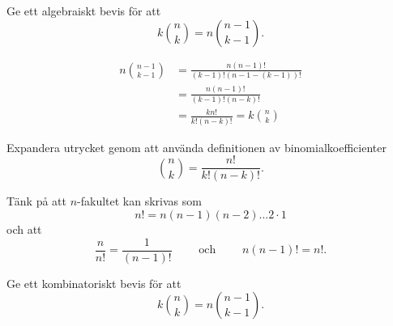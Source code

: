 \documentclass{tufte-handout}
\begin{document}
\begin{xca}
	Ge ett algebraiskt bevis för att
	$$k\binom{n}{k} = n \binom{n-1}{k-1}.$$
\end{xca}

\begin{solution}
	\begin{align*}
		n \binom{n-1}{k-1} &= \frac{n(n-1)!}{(k-1)!(n-1-(k-1))!}\\
		&= \frac{n(n-1)!}{(k-1)!(n-k)!}\\
		&= \frac{k n!}{k!(n-k)!} = k\binom{n}{k}	
	\end{align*}
    
	\begin{tips}
		Expandera utrycket genom att använda definitionen av binomialkoefficienter
		$$\binom{n}{k} = \frac{n!}{k!(n-k)!}.$$

		Tänk på att $n$-fakultet kan skrivas som
		$$n! = n(n-1)(n-2)...2\cdot 1$$ 
		och att
		$$\frac{n}{n!} = \frac{1}{(n-1)!}\qquad\text{ och }\qquad n(n-1)! = n!.$$
	\end{tips}
\end{solution}
    
\begin{xca}
	Ge ett kombinatoriskt bevis för att
	$$k\binom{n}{k} = n \binom{n-1}{k-1}.$$
\end{xca}
\end{document}
